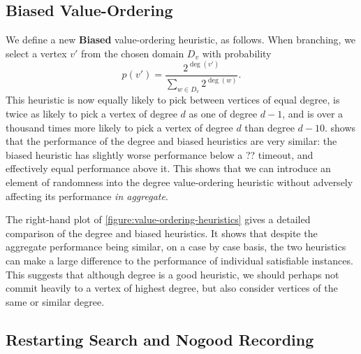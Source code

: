 \documentclass[runningheads]{llncs}
\begin{document}
\subsection{Biased Value-Ordering}

We define a new \textbf{Biased} value-ordering heuristic, as follows. When branching, we select a
vertex $v'$ from the chosen domain $D_v$ with probability \[ p(v') = \frac{2^{\deg(v')}}{\sum_{w \in
D_v}{2^{\deg(w)}}} \text{.} \] This heuristic is now equally likely to pick between vertices of
equal degree, is twice as likely to pick a vertex of degree $d$ as one of degree $d - 1$, and is
over a thousand times more likely to pick a vertex of degree $d$ than degree $d - 10$.
 shows that the performance of the degree and biased
heuristics are very similar: the biased heuristic has slightly worse performance below a ??
timeout, and effectively equal performance above it. This shows that we can introduce an element of
randomness into the degree value-ordering heuristic without adversely affecting its performance
\emph{in aggregate}.

The right-hand plot of \cref{figure:value-ordering-heuristics} gives a detailed comparison of the
degree and biased heuristics. It shows that despite the aggregate performance being similar, on a
case by case basis, the two heuristics can make a large difference to the performance of individual
satisfiable instances. This suggests that although degree is a good heuristic, we should perhaps not
commit heavily to a vertex of highest degree, but also consider vertices of the same or similar
degree.

\subsection{Restarting Search and Nogood Recording}
\end{document}
